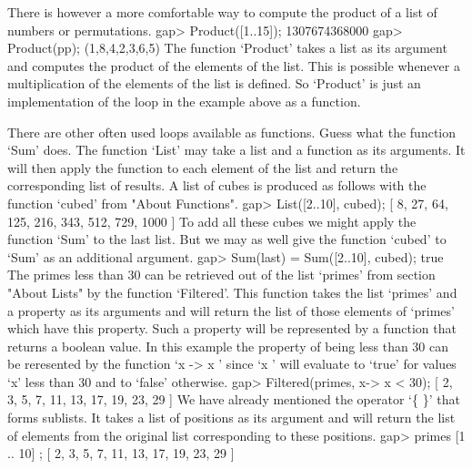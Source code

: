 
There is however a more comfortable way to  compute the product of a list
of numbers or permutations.
\beginexample
    gap> Product([1..15]);
    1307674368000
    gap> Product(pp);
    (1,8,4,2,3,6,5) 
\endexample
The function  `Product'  takes a  list as  its argument and computes  the
product  of  the  elements  of the  list.   This  is possible whenever  a
multiplication of  the elements of the list is defined.  So  `Product' is
just an implementation of the loop in the example above as a function.

There are other often used loops available as functions.   Guess what the
function `Sum' does.  The function `List' may  take a list and a function
as its arguments.  It will then apply the function to each element of the
list  and return  the corresponding list of results.   A list of cubes is
produced as follows with the function `cubed' from "About Functions".
\beginexample
    gap> List([2..10], cubed);
    [ 8, 27, 64, 125, 216, 343, 512, 729, 1000 ] 
\endexample
To add all these cubes  we might apply the  function  `Sum' to  the  last
list.  But we may  as well  give the  function  `cubed' to  `Sum'  as  an
additional argument.
\beginexample
    gap> Sum(last) = Sum([2..10], cubed);
    true 
\endexample
The  primes less than 30 can  be retrieved out  of the list `primes' from
section "About Lists" by the function `Filtered'. This function takes the
list `primes' and a property as its arguments and will return the list of
those elements of `primes' which have this property. Such a property will
be represented  by  a function  that  returns  a boolean  value. In  this
example the property  of  being less than  30  can be reresented  by  the
function `x  -> x ' since `x ' will evaluate to `true'  for
values `x' less than 30 and to `false' otherwise.
\beginexample
    gap> Filtered(primes, x-> x < 30);
    [ 2, 3, 5, 7, 11, 13, 17, 19, 23, 29 ] 
\endexample
We have already  mentioned the operator `\{  \}' that  forms sublists. It
takes a  list of positions  as its argument  and will return  the list of
elements from the original list corresponding to these positions.
\beginexample
    gap> primes{ [1 .. 10] };
    [ 2, 3, 5, 7, 11, 13, 17, 19, 23, 29 ] 
\endexample

